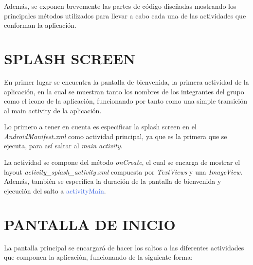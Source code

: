 \documentclass[letterpaper,twocolumn,openany,nodeprecatedcode,dvipsnames,nomultitoc]{dndbook}
\begin{document}
\par 
\begin{justify}

Además, se exponen brevemente las partes de código diseñadas mostrando los principales métodos utilizados para llevar a cabo cada una de las actividades que conforman la aplicación.


\section{SPLASH SCREEN}

\vspace{5pt}

\par 
En primer lugar se encuentra la pantalla de bienvenida, la primera actividad de la aplicación, en la cual se muestran tanto los nombres de los integrantes del grupo como el icono de la aplicación, funcionando por tanto como una simple transición al main activity de la aplicación.

\vspace{5pt}

\par
Lo primero a tener en cuenta es especificar la splash screen en el \textit{AndroidManifest.xml} como actividad principal, ya que es la primera que se ejecuta, para así saltar al \textit{main activity}.

\vspace{5pt}

\par
La actividad se compone del método \textit{onCreate}, el cual se encarga de mostrar el layout \textit{activity\_splash\_activity.xml} compuesta por \textit{TextViews} y una \textit{ImageView}. Además, también se especifica la duración de la pantalla de bienvenida y ejecución del salto a \textcolor{RoyalBlue}{activityMain}.


\section{PANTALLA DE INICIO}
\vspace{5pt}

\par 
La pantalla principal se encargará de hacer los saltos a las diferentes actividades que componen la aplicación, funcionando de la siguiente forma:


\end{justify}
\end{document}
